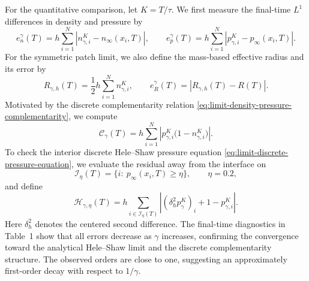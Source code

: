 \documentclass[11pt]{article}
\theoremstyle{plain}
\numberwithin{equation}{section}
\begin{document}
For the quantitative comparison, let \(K=T/\tau\). We first measure the
final-time \(L^1\) differences in density and pressure by
\[
e_n^\gamma(T)
=
h\sum_{i=1}^N
\left|n_{\gamma,i}^K-n_\infty(x_i,T)\right|,
\qquad
e_p^\gamma(T)
=
h\sum_{i=1}^N
\left|p_{\gamma,i}^K-p_\infty(x_i,T)\right|.
\]
For the symmetric patch limit, we also define the mass-based effective
radius and its error by
\[
R_{\gamma,h}(T)
=
\frac12 h\sum_{i=1}^N n_{\gamma,i}^K,
\qquad
e_R^\gamma(T)=|R_{\gamma,h}(T)-R(T)|.
\]
Motivated by the discrete complementarity relation
\eqref{eq:limit-density-pressure-complementarity}, we compute
\[
\mathcal C_\gamma(T)
=
h\sum_{i=1}^N
\left|p_{\gamma,i}^K\bigl(1-n_{\gamma,i}^K\bigr)\right|.
\]
To check the interior discrete Hele--Shaw pressure equation
\eqref{eq:limit-discrete-pressure-equation}, we evaluate the residual away
from the interface on
\[
\mathcal I_\eta(T)
=
\{i:\ p_\infty(x_i,T)\ge \eta\},
\qquad
\eta=0.2,
\]
and define
\[
\mathcal H_{\gamma,\eta}(T)
=
h\sum_{i\in\mathcal I_\eta(T)}
\left|
(\delta_h^2p_\gamma^K)_i+1-p_{\gamma,i}^K
\right|.
\]
Here \(\delta_h^2\) denotes the centered second difference. The final-time
diagnostics in Table~1 show that all errors decrease as \(\gamma\) increases,
confirming the convergence toward the analytical Hele--Shaw limit and the
discrete complementarity structure. The observed orders are close to one,
suggesting an approximately first-order decay with respect to \(1/\gamma\).
\end{document}
